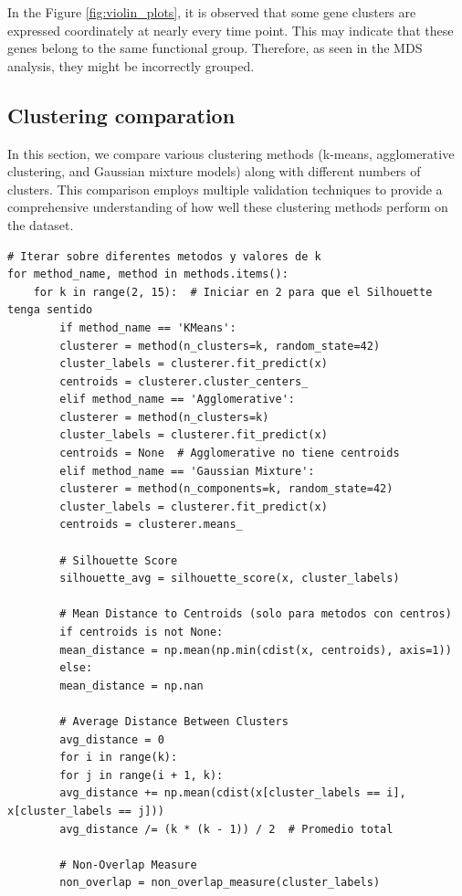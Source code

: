 \documentclass{article}
\begin{document}
In the Figure \ref{fig:violin_plots}, it is observed that some gene clusters are expressed coordinately at nearly every time point. This may indicate that these genes belong to the same functional group. Therefore, as seen in the MDS analysis, they might be incorrectly grouped. 

\subsection{Clustering comparation}

In this section, we compare various clustering methods (k-means, agglomerative clustering, and Gaussian mixture models) along with different numbers of clusters. This comparison employs multiple validation techniques to provide a comprehensive understanding of how well these clustering methods perform on the dataset. 

\begin{lstlisting}[style=mypython, caption=Violin Plots of Variables by Cluster, label=lst:violin]
# Iterar sobre diferentes metodos y valores de k
for method_name, method in methods.items():
	for k in range(2, 15):  # Iniciar en 2 para que el Silhouette tenga sentido
		if method_name == 'KMeans':
		clusterer = method(n_clusters=k, random_state=42)
		cluster_labels = clusterer.fit_predict(x)
		centroids = clusterer.cluster_centers_
		elif method_name == 'Agglomerative':
		clusterer = method(n_clusters=k)
		cluster_labels = clusterer.fit_predict(x)
		centroids = None  # Agglomerative no tiene centroids
		elif method_name == 'Gaussian Mixture':
		clusterer = method(n_components=k, random_state=42)
		cluster_labels = clusterer.fit_predict(x)
		centroids = clusterer.means_
		
		# Silhouette Score
		silhouette_avg = silhouette_score(x, cluster_labels)
		
		# Mean Distance to Centroids (solo para metodos con centros)
		if centroids is not None:
		mean_distance = np.mean(np.min(cdist(x, centroids), axis=1))
		else:
		mean_distance = np.nan
		
		# Average Distance Between Clusters
		avg_distance = 0
		for i in range(k):
		for j in range(i + 1, k):
		avg_distance += np.mean(cdist(x[cluster_labels == i], x[cluster_labels == j]))
		avg_distance /= (k * (k - 1)) / 2  # Promedio total
		
		# Non-Overlap Measure
		non_overlap = non_overlap_measure(cluster_labels)

\end{lstlisting}
\end{document}
